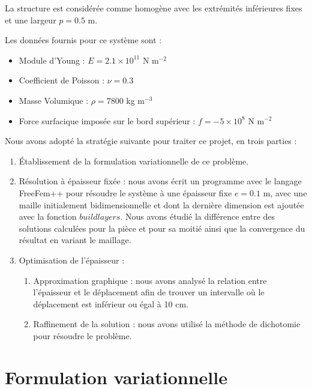 \documentclass{article}
\begin{document}
    La structure est considérée comme homogène avec les extrémités inférieures fixes et une largeur $p = 0.5$ m. 
    
    Les données fournis pour ce système sont :
    
    \begin{itemize}
    \item Module d'Young : $E = 2.1 \times 10^{11}$ N m$^{-2}$
    \item Coefficient de Poisson : $\nu = 0.3$ 
    \item Masse Volumique : $\rho = 7800$ kg m$^{-3}$
    \item Force surfacique imposée sur le bord supérieur : $f= - 5 \times 10^8$ N m$^{-2}$
    \end{itemize}
    
    Nous avons adopté la stratégie suivante pour traiter ce projet, en trois parties :
    \begin{enumerate}
        \item Établissement de la formulation variationnelle de ce problème.
        \item Résolution à épaisseur fixée : nous avons écrit un programme avec le langage FreeFem++ pour résoudre le système à une épaisseur fixe $e = 0.1$ m, 
            avec une maille initialement bidimensionnelle et dont la dernière dimension est ajoutée avec la fonction $buildlayers$. 
            Nous avons étudié la différence entre des solutions calculées pour la pièce et pour sa moitié ainsi que la convergence du résultat en variant le maillage.
        \item Optimisation de l'épaisseur :
        \begin{enumerate}
            \item Approximation graphique : 
                nous avons analysé la relation entre l'épaisseur et le déplacement afin de trouver un intervalle où le déplacement est inférieur ou égal à 10 cm.
            \item Raffinement de la solution : nous avons utilisé la méthode de dichotomie pour résoudre le problème.
        \end{enumerate}
    \end{enumerate}

    \newpage
    
    \section{Formulation variationnelle}
\end{document}
